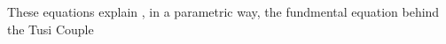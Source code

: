 \documentclass[preview]{standalone}
\begin{document}
\begin{center}
These equations explain , in a parametric way, the fundmental equation behind the Tusi Couple
\end{center}
\end{document}
